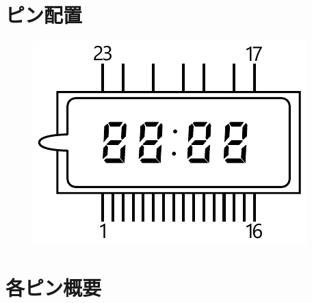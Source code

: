 \documentclass[12pt]{jarticle}
\begin{document}
\clearpage

\section{ピン配置}

\begin{figure}[h]
    \centering
    \includegraphics[width=0.7\linewidth]{../img/IVL275.pdf}
\end{figure}

\clearpage

\section{各ピン概要}
\end{document}
